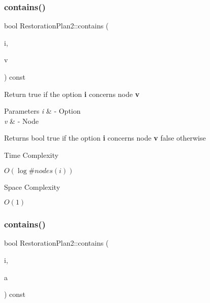 \subsubsection{\texorpdfstring{contains()}{contains()}\hspace{0.1cm}{\footnotesize\ttfamily [1/4]}}
{\footnotesize\ttfamily bool Restoration\+Plan2\+::contains (\begin{DoxyParamCaption}\item[{\hyperlink{class_restoration_plan2_aff164a2726831342bf87af5e11df1064}{Option}}]{i,  }\item[{Graph\+\_\+t\+::\+Node}]{v }\end{DoxyParamCaption}) const\hspace{0.3cm}{\ttfamily [inline]}}



Return true if the option {\bfseries i} concerns node {\bfseries v} 


\begin{DoxyParams}{Parameters}
{\em i} & -\/ Option \\
\hline
{\em v} & -\/ Node \\
\hline
\end{DoxyParams}
\begin{DoxyReturn}{Returns}
bool true if the option {\bfseries i} concerns node {\bfseries v} false otherwise 
\end{DoxyReturn}
\begin{DoxyRefDesc}{Time Complexity}
\item[\hyperlink{time__time000009}{Time Complexity}]$O(\log \#nodes(i))$ \end{DoxyRefDesc}
\begin{DoxyRefDesc}{Space Complexity}
\item[\hyperlink{space__space000009}{Space Complexity}]$O(1)$ \end{DoxyRefDesc}
\mbox{\label{class_restoration_plan2_a1884daec27de69af8302b961aee1b232}} 
\subsubsection{\texorpdfstring{contains()}{contains()}\hspace{0.1cm}{\footnotesize\ttfamily [2/4]}}
{\footnotesize\ttfamily bool Restoration\+Plan2\+::contains (\begin{DoxyParamCaption}\item[{\hyperlink{class_restoration_plan2_aff164a2726831342bf87af5e11df1064}{Option}}]{i,  }\item[{Graph\+\_\+t\+::\+Arc}]{a }\end{DoxyParamCaption}) const\hspace{0.3cm}{\ttfamily [inline]}}



